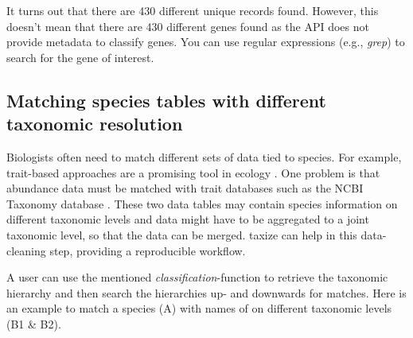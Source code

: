 \begin{sloppypar}
It turns out that there are 430 different unique records found. 
However, this doesn't mean that there are 430 different genes found as the API does not provide metadata to classify genes. 
You can use regular expressions (e.g., \emph{grep}) to search for the gene of interest.


\subsection{Matching species tables with different taxonomic resolution}
Biologists often need to match different sets of data tied to species. 
For example, trait-based approaches are a promising tool in ecology \citep{statzner_can_2010}. 
One problem is that abundance data must be matched with trait databases such as the NCBI Taxonomy database \citep{usseglio-polatera_biological_2000}. 
These two data tables may contain species information on different taxonomic levels and data might have to be aggregated to a joint taxonomic level, so that the data can be merged. 
taxize can help in this data-cleaning step, providing a reproducible workflow.

A user can use the mentioned \emph{classification}-function to retrieve the taxonomic hierarchy and then search the hierarchies up- and downwards for matches. 
Here is an example to match a species (A) with names of on different taxonomic levels (B1 \& B2).

\begin{knitrout}\small
\color{fgcolor}
\end{knitrout}


\end{sloppypar}
